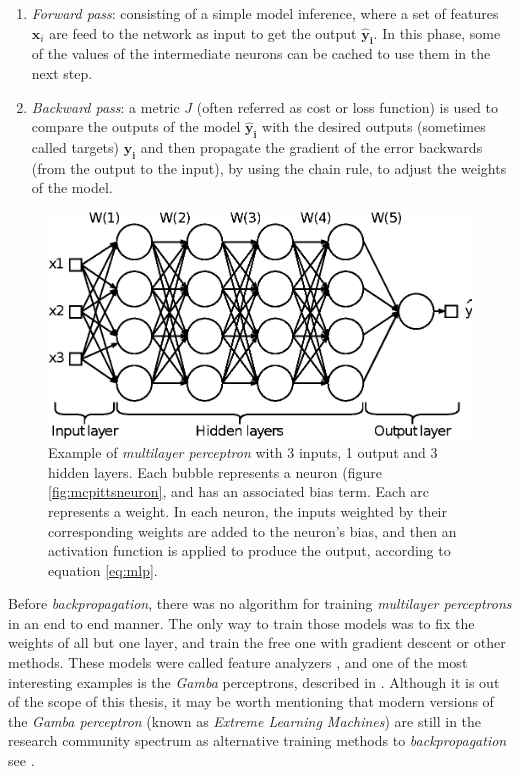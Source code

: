 \begin{enumerate}
\item \textit{Forward pass}: consisting of a simple model inference, where a set of features $\mathbf{x}_i$ are feed to the network as input to get the output $\mathbf{\hat{y}_i}$. In this phase, some of the values of the intermediate neurons can be cached to use them in the next step.

\item \textit{Backward pass}: a metric $J$ (often referred as cost or loss function) is used to compare the outputs of the model $\mathbf{\hat{y}_i}$ with the desired outputs (sometimes called targets) $\mathbf{y_i}$ and then propagate the gradient of the error backwards (from the output to the input), by using the chain rule, to adjust the weights of the model.
\end{enumerate}


\begin{figure}
	\centering
	\includegraphics[width=0.8\linewidth]{chapter2/images/mlp}
	\caption{Example of \textit{multilayer perceptron} with 3 inputs, 1 output and 3 hidden layers. Each bubble represents a neuron (figure \ref{fig:mcpittsneuron}, and has an associated bias term. Each arc represents a weight. In each neuron, the inputs weighted by their corresponding weights are added to the neuron's bias, and then an activation function is applied to produce the output, according to equation \ref{eq:mlp}.}
	\label{fig:mlp}
\end{figure}


Before \textit{backpropagation}, there was no algorithm for training \textit{multilayer perceptrons} in an end to end manner. The only way to train those models was to fix the weights of all but one layer, and train the free one with gradient descent or other methods. These models were called feature analyzers \autocite{hinton1986}, and one of the most interesting examples is the \textit{Gamba} perceptrons, described in \autocite{minsky69}. Although it is out of the scope of this thesis, it may be worth mentioning that modern versions of the \textit{Gamba perceptron} (known as \textit{Extreme Learning Machines}) are still in the research community spectrum as alternative training methods to \textit{backpropagation} see \autocite{Huang2006, Huang2012}.

